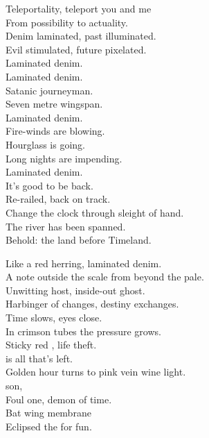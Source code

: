 Teleportality, teleport you and me \\
From possibility to actuality. \\
Denim laminated, past illuminated. \\
Evil stimulated, future pixelated. \\

Laminated denim. \\

Laminated denim. \\
Satanic journeyman. \\
Seven metre wingspan. \\
Laminated denim. \\
Fire-winds are blowing. \\
Hourglass is going. \\
Long nights are impending. \\
Laminated denim. \\

It's good to be back. \\
Re-railed, back on track. \\
Change the clock through sleight of hand. \\
The river has been spanned. \\
Behold: the land before Timeland. \\





Like a red herring, laminated denim. \\
A note outside the scale from beyond the pale. \\
Unwitting host, inside-out ghost. \\
Harbinger of changes, destiny exchanges. \\

Time slows, eyes close. \\
In crimson tubes the pressure grows. \\
Sticky red , life theft. \\
 is all that's left. \\

Golden hour turns to pink vein wine light. \\
 son, \\
Foul one, demon of time. \\
Bat wing membrane \\
Eclipsed the  for fun. \\

